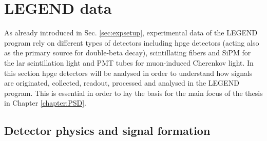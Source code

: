 \chapter{LEGEND data}
As already introduced in Sec. \ref{sec:expsetup}, experimental data of the LEGEND program rely on different types of detectors including \ac{hpge} detectors (acting also as the primary source for double-beta decay), scintillating fibers and SiPM for the \ac{lar} scintillation light and PMT tubes for muon-induced Cherenkov light. In this section \ac{hpge} detectors will be analysed in order to understand how signals are originated, collected, readout, processed and analysed in the LEGEND program. This is essential in order to lay the basis for the main focus of the thesis in Chapter \ref{chapter:PSD}.

\section{Detector physics and signal formation}

